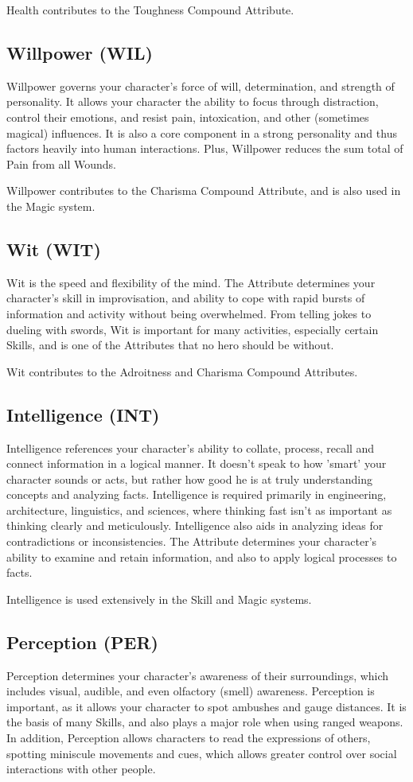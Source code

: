 \documentclass[oneside,11pt,english]{book}
\begin{document}
Health contributes to the Toughness Compound Attribute. 
\subsection*{Willpower (WIL)}
Willpower governs your character’s force of will, determination, and strength of personality. 
It allows your character the ability to focus through distraction, control their emotions, and resist pain, 
intoxication, and other (sometimes magical) influences. It is also a core component in a strong personality 
and thus factors heavily into human interactions. Plus, Willpower reduces the sum total of Pain from all 
Wounds. 

 
Willpower contributes to the Charisma Compound Attribute, and is also used in the Magic system. 
\subsection*{Wit (WIT)}
Wit is the speed and flexibility of the mind. The Attribute determines your character’s skill in 
improvisation, and ability to cope with rapid bursts of information and activity without being 
overwhelmed. From telling jokes to dueling with swords, Wit is important for many activities, especially 
certain Skills, and is one of the Attributes that no hero should be without. 

 
Wit contributes to the Adroitness and Charisma Compound Attributes. 
\subsection*{Intelligence (INT)}
Intelligence references your character's ability to collate, process, recall and connect information in a 
logical manner. It doesn’t speak to how 'smart' your character sounds or acts, but rather how good he is at 
truly understanding concepts and analyzing facts. Intelligence is required primarily in engineering, 
architecture, linguistics, and sciences, where thinking fast isn't as important as thinking clearly and 
meticulously. Intelligence also aids in analyzing ideas for contradictions or inconsistencies. The Attribute 
determines your character’s ability to examine and retain information, and also to apply logical processes 
to facts. 
 

Intelligence is used extensively in the Skill and Magic systems. 
\subsection*{Perception (PER)}
Perception determines your character's awareness of their surroundings, which includes visual, audible, 
and even olfactory (smell) awareness. Perception is important, as it allows your character to spot 
ambushes and gauge distances. It is the basis of many Skills, and also plays a major role when using 
ranged weapons. In addition, Perception allows characters to read the expressions of others, spotting 
miniscule movements and cues, which allows greater control over social interactions with other people. 
\end{document}
